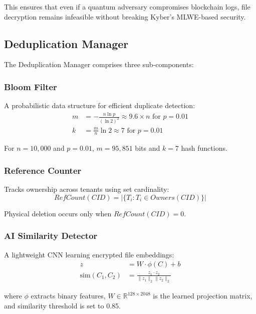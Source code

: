 \documentclass[conference]{IEEEtran}
\begin{document}
This ensures that even if a quantum adversary compromises blockchain logs, file decryption remains infeasible without breaking Kyber's MLWE-based security.

\subsection{Deduplication Manager}
The Deduplication Manager comprises three sub-components:

\subsubsection{Bloom Filter}
A probabilistic data structure for efficient duplicate detection:
\begin{equation}
\label{eq:bloom}
\begin{split}
m &= -\frac{n \ln p}{(\ln 2)^2} \approx 9.6 \times n \text{ for } p=0.01 \\
k &= \frac{m}{n} \ln 2 \approx 7 \text{ for } p=0.01
\end{split}
\end{equation}

For $n=10,000$ and $p=0.01$, $m=95,851$ bits and $k=7$ hash functions.

\subsubsection{Reference Counter}
Tracks ownership across tenants using set cardinality:
\begin{equation}
\label{eq:refcount}
RefCount(CID) = |\{T_i : T_i \in Owners(CID)\}|
\end{equation}

Physical deletion occurs only when $RefCount(CID) = 0$.

\subsubsection{AI Similarity Detector}
A lightweight CNN learning encrypted file embeddings:
\begin{equation}
\label{eq:cnn}
\begin{split}
z &= W \cdot \phi(C) + b \\
\text{sim}(C_1, C_2) &= \frac{z_1 \cdot z_2}{\|z_1\|_2 \|z_2\|_2}
\end{split}
\end{equation}

where $\phi$ extracts binary features, $W \in \mathbb{R}^{128 \times 2048}$ is the learned projection matrix, and similarity threshold is set to 0.85.
\end{document}
